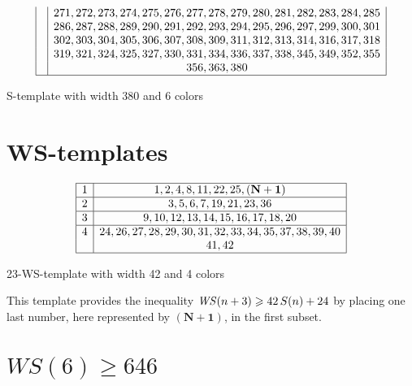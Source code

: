 \begin{table}[H]
\[\begin{array}{|*{2}{c|}}
	& 271, 272, 273, 274, 275, 276, 277, 278, 279, 280, 281, 282, 283, 284, 285\\
	& 286, 287, 288, 289, 290, 291, 292, 293, 294, 295, 296, 297, 299, 300, 301\\
	& 302, 303, 304, 305, 306, 307, 308, 309, 311, 312, 313, 314, 316, 317, 318\\
	& 319, 321, 324, 325, 327, 330, 331, 334, 336, 337, 338, 345, 349, 352, 355\\
	& 356, 363, 380\\
	\hline
\end{array}
\]
\vspace{-3ex}
\caption{S-template with width 380 and 6 colors}
\vspace{-2ex}
\end{table}

\section{WS-templates}
\label{WS-templates}

\vspace{-1.5ex}

\begin{table}[H]
\[
\begin{array}{|*{2}{c|}}
	\hline
	1 & 1, 2, 4, 8, 11, 22, 25, \mathbf{(N+1)}\\
	\hline
	2 & 3, 5, 6, 7, 19, 21, 23, 36\\
	\hline
	3 & 9, 10, 12, 13, 14, 15, 16, 17, 18, 20\\
	\hline
	4 & 24, 26, 27, 28, 29, 30, 31, 32, 33, 34, 35, 37, 38, 39, 40\\
	& 41, 42\\
	\hline
\end{array}
\]
\vspace{-3ex}
\caption{23-WS-template with width 42 and 4 colors}
\vspace{-1ex}
\end{table}

This template provides the inequality \(\mathit{WS} (n+3) \geqslant 42 \, S(n) + 24\)
by placing one last number, here represented by \(\mathbf{(N+1)}\), in the first subset.

\resetarraystretch

\section{\(WS(6) \geqslant 646\)}
\label{WS(6)}

